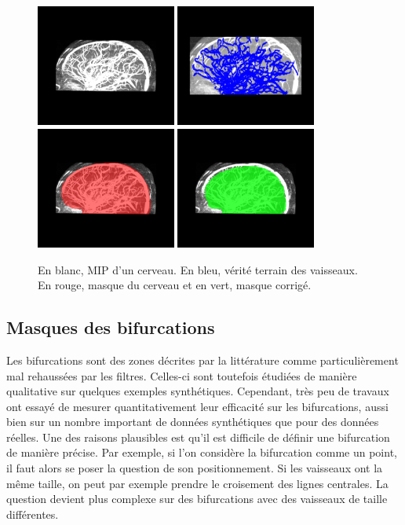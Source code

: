 \begin{figure}[!ht]
  \centering
  \includegraphics[height=4cm]{Images/bullitt_brain.png}
  \includegraphics[height=4cm]{Images/bullitt_gt.png}
  \includegraphics[height=4cm]{Images/bullitt_brainMask.png}
  \includegraphics[height=4cm]{Images/bullitt_brainMask_ok.png}
  \caption{En blanc, MIP d'un cerveau. En bleu, vérité terrain des vaisseaux. En rouge, masque du cerveau et en vert, masque corrigé.}
  \label{fig:masques_Bullitt}
\end{figure}

\subsection{Masques des bifurcations}

Les bifurcations sont des zones décrites par la littérature comme particulièrement mal rehaussées par les filtres. Celles-ci sont toutefois étudiées de manière qualitative sur quelques exemples synthétiques. Cependant, très peu de travaux ont essayé de mesurer quantitativement leur efficacité sur les bifurcations, aussi bien sur un nombre important de données synthétiques que pour des données réelles. Une des raisons plausibles est qu'il est difficile de définir une bifurcation de manière précise. Par exemple, si l'on considère la bifurcation comme un point, il faut alors se poser la question de son positionnement. Si les vaisseaux ont la même taille, on peut par exemple prendre le croisement des lignes centrales. La question devient plus complexe sur des bifurcations avec des vaisseaux de taille différentes.

